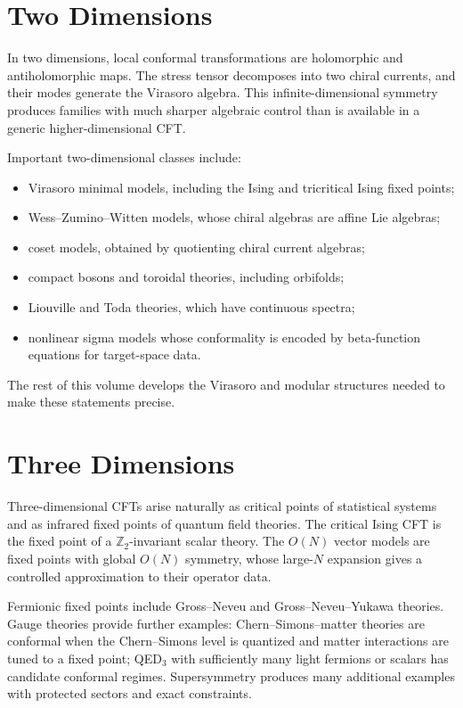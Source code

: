 \section{Two Dimensions}

In two dimensions, local conformal transformations are holomorphic and
antiholomorphic maps.  The stress tensor decomposes into two chiral currents,
and their modes generate the Virasoro algebra.  This infinite-dimensional
symmetry produces families with much sharper algebraic control than is
available in a generic higher-dimensional CFT.

Important two-dimensional classes include:
\begin{itemize}
  \item Virasoro minimal models, including the Ising and tricritical Ising
  fixed points;
  \item Wess--Zumino--Witten models, whose chiral algebras are affine Lie
  algebras;
  \item coset models, obtained by quotienting chiral current algebras;
  \item compact bosons and toroidal theories, including orbifolds;
  \item Liouville and Toda theories, which have continuous spectra;
  \item nonlinear sigma models whose conformality is encoded by beta-function
  equations for target-space data.
\end{itemize}
The rest of this volume develops the Virasoro and modular structures needed
to make these statements precise.

\section{Three Dimensions}

Three-dimensional CFTs arise naturally as critical points of statistical
systems and as infrared fixed points of quantum field theories.  The critical
Ising CFT is the fixed point of a \(\mathbb Z_2\)-invariant scalar theory.
The \(O(N)\) vector models are fixed points with global \(O(N)\) symmetry,
whose large-\(N\) expansion gives a controlled approximation to their operator
data.

Fermionic fixed points include Gross--Neveu and Gross--Neveu--Yukawa theories.
Gauge theories provide further examples: Chern--Simons--matter theories are
conformal when the Chern--Simons level is quantized and matter interactions
are tuned to a fixed point; QED\(_3\) with sufficiently many light fermions or
scalars has candidate conformal regimes.  Supersymmetry produces many
additional examples with protected sectors and exact constraints.


